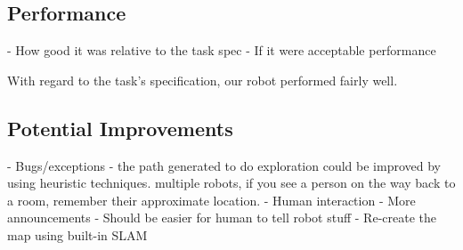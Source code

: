 \documentclass[conference]{IEEEtran}
\begin{document}
\subsection{Performance}
- How good it was relative to the task spec
- If it were acceptable performance %

With regard to the task's specification, our robot performed fairly well.


\subsection{Potential Improvements}

- Bugs/exceptions
- the path generated to do exploration could be improved by using heuristic techniques. multiple robots, if you see a person on the way back to a room, remember their approximate location.
- Human interaction
   - More announcements
   - Should be easier for human to tell robot stuff
- Re-create the map using built-in SLAM



\end{document}
